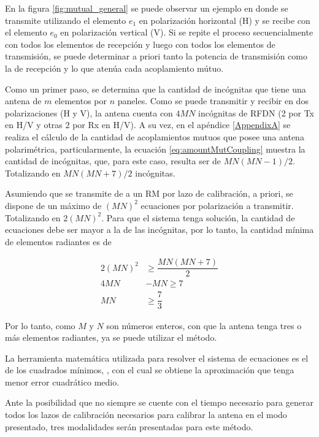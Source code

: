 En la figura \ref{fig:mutual_general} se puede observar un ejemplo en donde se transmite utilizando el elemento $e_1$ en 
polarización horizontal (H) y se recibe con el elemento $e_0$ en polarización vertical (V). Si se repite el proceso 
secuencialmente con todos los elementos de recepción y luego con todos los elementos de transmisión, se puede determinar a 
priori tanto la potencia de transmisión como la de recepción y lo que atenúa cada acoplamiento mútuo.

Como un primer paso, se determina que la cantidad de incógnitas que tiene una antena de $m$ elementos por $n$ paneles. Como 
se puede transmitir y recibir en dos polarizaciones (H y V), la antena cuenta con $4MN$ incógnitas de RFDN (2 por Tx en H/V y 
otras 2 por Rx en H/V). A su vez, en el apéndice \ref{AppendixA} se realiza el cálculo de la cantidad de acoplamientos mutuos
que posee una antena polarimétrica, particularmente, la ecuación \ref{eq:amountMutCoupling} muestra la cantidad de 
incógnitas, que, para este caso, resulta ser de $MN(MN-1)/2$. Totalizando en $MN(MN + 7)/2$ incógnitas.

Asumiendo que se transmite de a un RM por lazo de calibración, a priori, se dispone de un máximo de $(MN)^2$ ecuaciones por
polarización a transmitir. Totalizando en $2(MN)^2$. Para que el sistema tenga solución, la cantidad de ecuaciones debe ser 
mayor a la de las incógnitas, por lo tanto, la cantidad mínima de elementos radiantes es de

$$
\begin{aligned}
	2(MN)^2 &\ge  \dfrac{MN(MN + 7)}{2} \\
	4MN &- MN \ge7 \\
	MN &\ge \dfrac{7}{3}
\end{aligned}
$$

Por lo tanto, como $M$ y $N$ son números enteros, con que la antena tenga tres o más elementos radiantes, ya se puede utilizar el método.

La herramienta matemática utilizada para resolver el sistema de ecuaciones es el de los cuadrados mínimos, 
, con el cual se obtiene la aproximación que tenga menor error cuadrático medio. 

Ante la posibilidad que no siempre se cuente con el tiempo necesario para generar todos los lazos de calibración necesarios para calibrar la antena en el modo presentado, tres modalidades serán presentadas para este método. 

